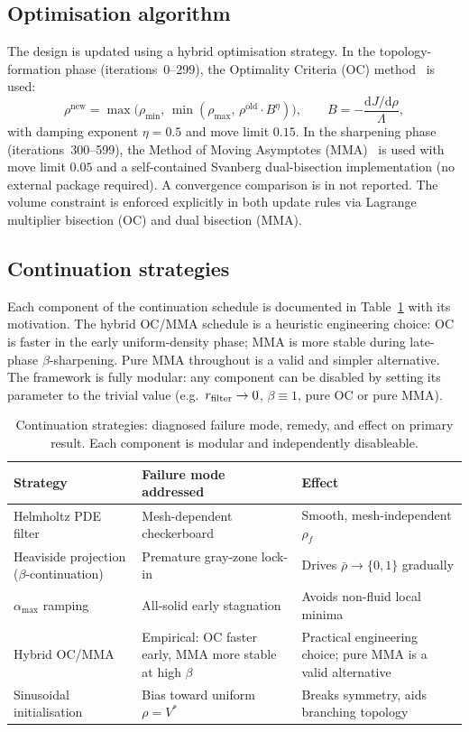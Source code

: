 \subsection{Optimisation algorithm}
The design is updated using a hybrid optimisation strategy.
In the topology-formation phase (iterations~0--299), the
Optimality Criteria (OC) method~\cite{bendsoe2003} is used:
\begin{equation}
    \rho^{\mathrm{new}} = \max\!\bigl(\rho_{\min},\,
        \min(\rho_{\max},\,\rho^{\mathrm{old}} \cdot B^\eta)\bigr),
    \qquad B = -\frac{\mathrm{d}J/\mathrm{d}\rho}{\Lambda},
    \label{eq:oc}
\end{equation}
with damping exponent $\eta=0.5$ and move limit $0.15$.
In the sharpening phase (iterations~300--599), the Method of Moving
Asymptotes (MMA)~\cite{svanberg1987} is used with move limit $0.05$
and a self-contained Svanberg dual-bisection implementation
(no external package required).
A convergence comparison is in not reported.
The volume constraint is enforced explicitly in both update rules
via Lagrange multiplier bisection (OC) and dual bisection (MMA).

\subsection{Continuation strategies}
\label{sec:continuation}
Each component of the continuation schedule is documented
in Table~\ref{tab:continuation} with its motivation.
The hybrid OC/MMA schedule is a heuristic engineering choice:
OC is faster in the early uniform-density phase;
MMA is more stable during late-phase $\beta$-sharpening.
Pure MMA throughout is a valid and simpler alternative.
The framework is fully modular: any component can be
disabled by setting its parameter to the trivial value
(e.g.\ $r_{\rm filter}\to0$, $\beta\equiv1$,
pure OC or pure MMA).

\begin{table}[h]
\centering\small
\caption{Continuation strategies: diagnosed failure mode,
         remedy, and effect on primary result.
         Each component is modular and independently disableable.}
\label{tab:continuation}
\begin{tabular}{@{}p{2.8cm}p{3.8cm}p{3.8cm}@{}}
\toprule
\textbf{Strategy} & \textbf{Failure mode addressed} & \textbf{Effect} \\
\midrule
Helmholtz PDE filter & Mesh-dependent checkerboard & Smooth, mesh-independent $\rho_f$ \\
Heaviside projection ($\beta$-continuation) & Premature gray-zone lock-in & Drives $\bar\rho\to\{0,1\}$ gradually \\
$\alpha_{\max}$ ramping & All-solid early stagnation & Avoids non-fluid local minima \\
Hybrid OC/MMA & Empirical: OC faster early, MMA more stable at high $\beta$ & Practical engineering choice; pure MMA is a valid alternative \\
Sinusoidal initialisation & Bias toward uniform $\rho=V^*$ & Breaks symmetry, aids branching topology \\
\bottomrule
\end{tabular}
\end{table}


